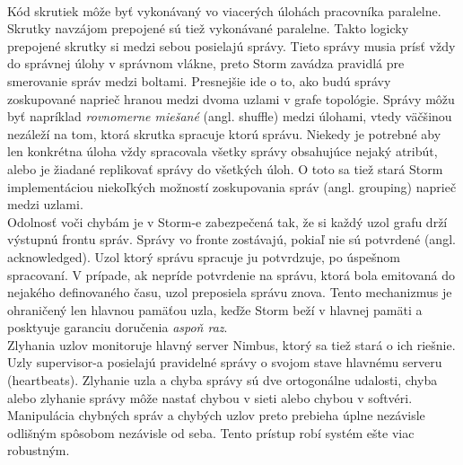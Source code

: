 \\[5pt]
Kód skrutiek môže byť vykonávaný vo viacerých úlohách pracovníka paralelne. Skrutky navzájom prepojené sú tiež vykonávané paralelne. Takto logicky prepojené skrutky si medzi sebou posielajú správy. Tieto správy musia prísť vždy do správnej úlohy v správnom vlákne, preto Storm zavádza pravidlá pre smerovanie správ medzi boltami. Presnejšie ide o to, ako budú správy zoskupované naprieč hranou medzi dvoma uzlami v grafe topológie. Správy môžu byť napríklad \textit{rovnomerne miešané} (angl. shuffle) medzi úlohami, vtedy väčšinou nezáleží na tom, ktorá skrutka spracuje ktorú správu. Niekedy je potrebné aby len konkrétna úloha vždy spracovala všetky správy obsahujúce nejaký atribút, alebo je žiadané replikovať správy do všetkých úloh. O toto sa tiež stará Storm implementáciou niekoľkých možností zoskupovania správ (angl. grouping) naprieč medzi uzlami. 
\\[5pt]
Odolnosť voči chybám je v Storm-e zabezpečená tak, že si každý uzol grafu drží výstupnú frontu správ. Správy vo fronte zostávajú, pokiaľ nie sú potvrdené (angl. acknowledged). Uzol ktorý správu spracuje ju potvrdzuje, po úspešnom spracovaní. V prípade, ak nepríde potvrdenie na správu, ktorá bola emitovaná do nejakého definovaného času, uzol preposiela správu znova. Tento mechanizmus je ohraničený len hlavnou pamäťou uzla, keďže Storm beží v hlavnej pamäti a posktyuje garanciu doručenia \textit{aspoň raz}. 
\\[5pt]
Zlyhania uzlov monitoruje hlavný server Nimbus, ktorý sa tiež stará o ich riešnie. Uzly supervisor-a posielajú pravidelné správy o svojom stave hlavnému serveru (heartbeats). Zlyhanie uzla a chyba správy sú dve ortogonálne udalosti, chyba alebo zlyhanie správy môže nastať chybou v sieti alebo chybou v softvéri. Manipulácia chybných správ a chybých uzlov preto prebieha úplne nezávisle odlišným spôsobom nezávisle od seba. Tento prístup robí systém ešte viac robustným.

